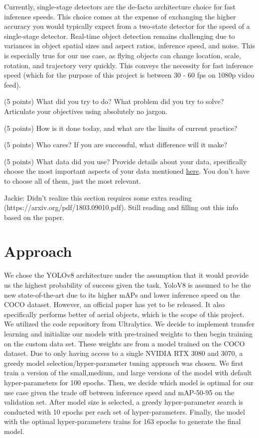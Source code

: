 \documentclass[10pt,twocolumn,letterpaper]{article}
\begin{document}
Currently, single-stage detectors are the de-facto architecture choice for fast inference speeds. This choice comes at the expense of exchanging the higher accuracy you would typically expect from a two-state detector for the speed of a single-stage detector. Real-time object detection remains challenging due to variances in object spatial sizes and aspect ratios, inference speed, and noise. This is especially true for our use case, as flying objects can change location, scale, rotation, and trajectory very quickly. This conveys the necessity for fast inference speed (which for the purpose of this project is between 30 - 60 fps on 1080p video feed). 



(5 points) What did you try to do? What problem did you try to solve? Articulate your objectives using absolutely no jargon. 

(5 points) How is it done today, and what are the limits of current practice?

(5 points) Who cares? If you are successful, what difference will it make? 

(5 points) What data did you use? Provide details about your data, specifically choose the most important aspects of your data mentioned \href{https://arxiv.org/abs/1803.09010}{here}. You don’t have to choose all of them, just the most relevant.

Jackie: Didn't realize this section requires some extra reading (https://arxiv.org/pdf/1803.09010.pdf). Still reading and filling out this info based on the paper.
\section{Approach}

We chose the YOLOv8 architecture under the assumption that it would provide us the highest probability of success given the task. YoloV8 is 
assumed to be the new state-of-the-art due to its higher mAPs and lower inference speed on the COCO dataset. However, an official paper has 
yet to be released. It also specifically performs better of aerial objects, which is the scope of this project. We utilized the code repository 
from Ultralytics. We decide to implement transfer learning and initialize our models with pre-trained weights to then begin training on the 
custom data set. These weights are from a model trained on the COCO dataset. Due to only having access to a single NVIDIA RTX 3080 and 3070, 
a greedy model selection/hyper-parameter tuning approach was chosen. We first train a version of the small,medium, and large versions of the 
model with default hyper-parameters for 100 epochs. Then, we decide which model is optimal for our use case given the trade off between inference 
speed and mAP-50-95 on the validation set. After model size is selected, a greedy hyper-parameter search is conducted with 10 epochs per each 
set of hyper-parameters. Finally, the model with the optimal hyper-parameters trains for 163 epochs to generate the final model.
\end{document}

